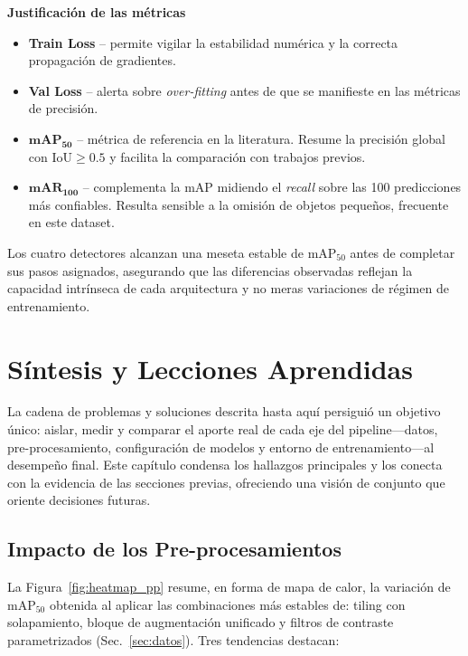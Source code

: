 \textbf{Justificación de las métricas}

\begin{itemize}
  \item \textbf{Train Loss} – permite vigilar la estabilidad numérica y la correcta propagación de gradientes.
  \item \textbf{Val Loss} – alerta sobre \emph{over-fitting} antes de que se manifieste en las métricas de precisión.
  \item \(\mathbf{mAP_{50}}\) – métrica de referencia en la literatura.
  Resume la precisión global con \(\text{IoU}\ge0.5\) y facilita la comparación con trabajos previos.
  \item \(\mathbf{mAR_{100}}\) – complementa la mAP midiendo el \emph{recall} sobre las 100 predicciones más confiables.
  Resulta sensible a la omisión de objetos pequeños, frecuente en este dataset.
\end{itemize}

Los cuatro detectores alcanzan una meseta estable de \(\text{mAP}_{50}\) antes de completar sus pasos asignados, asegurando que las diferencias observadas reflejan la capacidad intrínseca de cada arquitectura y no meras variaciones de régimen de entrenamiento.

\section{Síntesis y Lecciones Aprendidas}\label{sec:sintesis}

La cadena de problemas y soluciones descrita hasta aquí persiguió un objetivo único: aislar, medir y comparar el aporte real de cada eje del pipeline—datos, pre-procesamiento, configuración de modelos y entorno de entrenamiento—al desempeño final.
Este capítulo condensa los hallazgos principales y los conecta con la evidencia de las secciones previas, ofreciendo una visión de conjunto que oriente decisiones futuras.

\subsection{Impacto de los Pre-procesamientos}

La Figura~\ref{fig:heatmap_pp} resume, en forma de mapa de calor, la variación de \(\text{mAP}_{50}\) obtenida al aplicar las combinaciones más estables de: tiling con solapamiento, bloque de augmentación unificado y filtros de contraste parametrizados (Sec.~\ref{sec:datos}).
Tres tendencias destacan:

